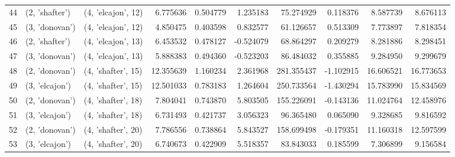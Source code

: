 \begin{tabular}{lllrrrrrrr}
44 &   (2, 'shafter') &  (4, 'elcajon', 12) &   6.775636 &   0.504779 &   1.235183 &   75.274929 &  0.118376 &   8.587739 &   8.676113 \\
45 &   (3, 'donovan') &  (4, 'elcajon', 12) &   4.850475 &   0.403598 &   0.832577 &   61.126657 &  0.513309 &   7.773897 &   7.818354 \\
46 &   (2, 'shafter') &  (4, 'elcajon', 13) &   6.453532 &   0.478127 &  -0.524079 &   68.864297 &  0.209279 &   8.281886 &   8.298451 \\
47 &   (3, 'donovan') &  (4, 'elcajon', 13) &   5.888383 &   0.494360 &  -0.523203 &   86.484032 &  0.355885 &   9.284950 &   9.299679 \\
48 &   (2, 'donovan') &  (4, 'shafter', 15) &  12.355639 &   1.160234 &   2.361968 &  281.355437 & -1.102915 &  16.606521 &  16.773653 \\
49 &   (3, 'elcajon') &  (4, 'shafter', 15) &  12.501033 &   0.783183 &   1.264604 &  250.733564 & -1.430294 &  15.783990 &  15.834569 \\
50 &   (2, 'donovan') &  (4, 'shafter', 18) &   7.804041 &   0.743870 &   5.803505 &  155.226091 & -0.143136 &  11.024764 &  12.458976 \\
51 &   (3, 'elcajon') &  (4, 'shafter', 18) &   6.731493 &   0.421737 &   3.056323 &   96.365480 &  0.065090 &   9.328685 &   9.816592 \\
52 &   (2, 'donovan') &  (4, 'shafter', 20) &   7.786556 &   0.738864 &   5.843527 &  158.699498 & -0.179351 &  11.160318 &  12.597599 \\
53 &   (3, 'elcajon') &  (4, 'shafter', 20) &   6.740673 &   0.422909 &   5.518357 &   83.843033 &  0.185599 &   7.306899 &   9.156584 \\
\bottomrule
\end{tabular}
